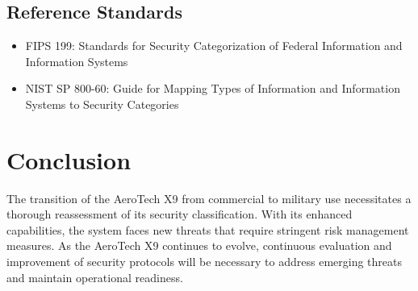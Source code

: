 \documentclass{article}
\begin{document}
\subsection{Reference Standards}
\begin{itemize}
    \item \cite{fips199} FIPS 199: Standards for Security Categorization of Federal Information and Information Systems
    \item \cite{nistsp80060v1r1} NIST SP 800-60: Guide for Mapping Types of Information and Information Systems to Security Categories
\end{itemize}

\section{Conclusion}
\par The transition of the AeroTech X9 from commercial to military use 
necessitates a thorough reassessment of its security classification. 
With its enhanced capabilities, the system faces new threats that require 
stringent risk management measures. As the AeroTech X9 continues to evolve, 
continuous evaluation and improvement of security protocols will be 
necessary to address emerging threats and maintain operational readiness.

\newpage

{}
\end{document}
